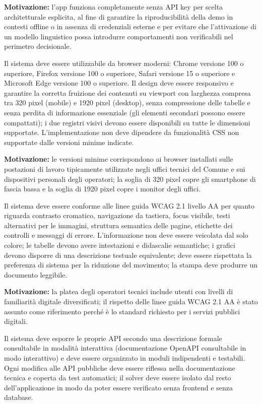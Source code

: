 \textbf{Motivazione:} l'app funziona completamente senza API key per scelta architetturale esplicita, al fine di garantire la riproducibilità della demo in contesti offline o in assenza di credenziali esterne e per evitare che l'attivazione di un modello linguistico possa introdurre comportamenti non verificabili nel perimetro decisionale.

 \label{rnf:compatibilita}
Il sistema deve essere utilizzabile da browser moderni: Chrome versione 100 o superiore, Firefox versione 100 o superiore, Safari versione 15 o superiore e Microsoft Edge versione 100 o superiore. Il design deve essere responsivo e garantire la corretta fruizione dei contenuti su viewport con larghezza compresa tra 320 pixel (mobile) e 1920 pixel (desktop), senza compressione delle tabelle e senza perdita di informazione essenziale (gli elementi secondari possono essere compattati); i due registri visivi devono essere disponibili su tutte le dimensioni supportate. L'implementazione non deve dipendere da funzionalità CSS non supportate dalle versioni minime indicate.

\textbf{Motivazione:} le versioni minime corrispondono ai browser installati sulle postazioni di lavoro tipicamente utilizzate negli uffici tecnici del Comune e sui dispositivi personali degli operatori; la soglia di 320 pixel copre gli smartphone di fascia bassa e la soglia di 1920 pixel copre i monitor degli uffici.

 \label{rnf:accessibilita}
Il sistema deve essere conforme alle linee guida WCAG 2.1 livello AA per quanto riguarda contrasto cromatico, navigazione da tastiera, focus visibile, testi alternativi per le immagini, struttura semantica delle pagine, etichette dei controlli e messaggi di errore. L'informazione non deve essere veicolata dal solo colore; le tabelle devono avere intestazioni e didascalie semantiche; i grafici devono disporre di una descrizione testuale equivalente; deve essere rispettata la preferenza di sistema per la riduzione del movimento; la stampa deve produrre un documento leggibile.

\textbf{Motivazione:} la platea degli operatori tecnici include utenti con livelli di familiarità digitale diversificati; il rispetto delle linee guida WCAG 2.1 AA è stato assunto come riferimento perché è lo standard richiesto per i servizi pubblici digitali.

 \label{rnf:manutenibilita}
Il sistema deve esporre le proprie API secondo una descrizione formale consultabile in modalità interattiva (documentazione OpenAPI consultabile in modo interattivo) e deve essere organizzato in moduli indipendenti e testabili. Ogni modifica alle API pubbliche deve essere riflessa nella documentazione tecnica e coperta da test automatici; il solver deve essere isolato dal resto dell'applicazione in modo da poter essere verificato senza frontend e senza database.

